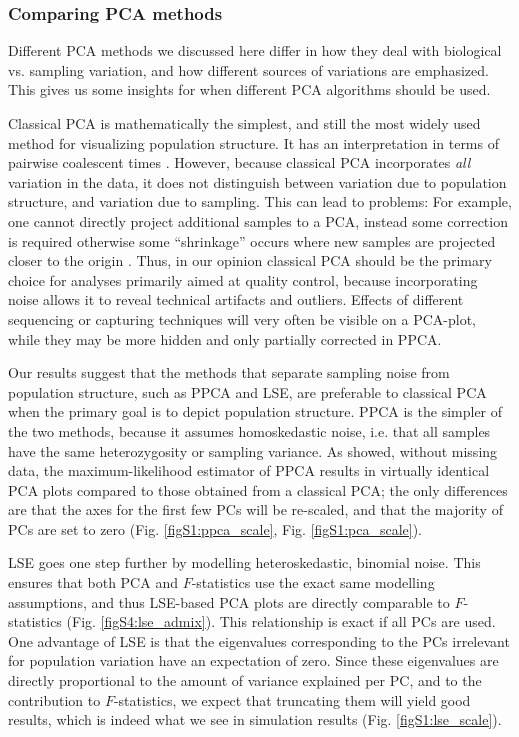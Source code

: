 \documentclass[12pt]{article}
\begin{document}
\subsubsection{Comparing PCA methods}\label{compare_pca_discussion}
Different PCA methods we discussed here differ in how they deal with biological vs. sampling variation, and how different sources of variations are emphasized. This gives us some insights for when different PCA algorithms should be used. 

Classical PCA is mathematically the simplest, and still the most widely used method for visualizing population structure. It has an interpretation in terms of pairwise coalescent times \citep{mcvean_genealogical_2009}. However, because classical PCA incorporates \emph{all} variation in the data, it does not distinguish between variation due to population structure, and variation due to sampling. This can lead to problems: For example, one cannot directly project additional samples to a PCA, instead some correction is required otherwise some ``shrinkage'' occurs where new samples are projected closer to the origin \citep{patterson_population_2006, wang_improved_2015}. Thus, in our opinion classical PCA should be the primary choice for analyses primarily aimed at quality control, because incorporating noise allows it to reveal technical artifacts and outliers. Effects of different sequencing or capturing techniques will very often be visible on a PCA-plot, while they may be more hidden and only partially corrected in PPCA.

Our results suggest that the methods that separate sampling noise from population structure, such as PPCA and LSE, are preferable to classical PCA when the primary goal is to depict population structure. PPCA is the simpler of the two methods, because it assumes homoskedastic noise, i.e. that all samples have the same heterozygosity or sampling variance. As \cite{tipping_probabilistic_1999-1} showed, without missing data, the maximum-likelihood estimator of PPCA results in virtually identical PCA plots compared to those obtained from a classical PCA; the only differences are that the axes for the first few PCs will be re-scaled, and that the majority of PCs are set to zero (Fig. \ref{figS1:ppca_scale}, Fig. \ref{figS1:pca_scale}).


LSE goes one step further by modelling heteroskedastic, binomial noise. This ensures that both PCA and $F$-statistics use the exact same modelling assumptions, and thus LSE-based PCA plots are directly comparable to $F$-statistics (Fig. \ref{figS4:lse_admix}). This relationship is exact if all PCs are used. One advantage of LSE is that the eigenvalues corresponding to the PCs irrelevant for population variation have an expectation of zero. Since these eigenvalues are directly proportional to the amount of variance explained per PC, and to the contribution to $F$-statistics, we expect that truncating them will yield good results, which is indeed what we see in simulation results (Fig. \ref{figS1:lse_scale}). 
\end{document}
